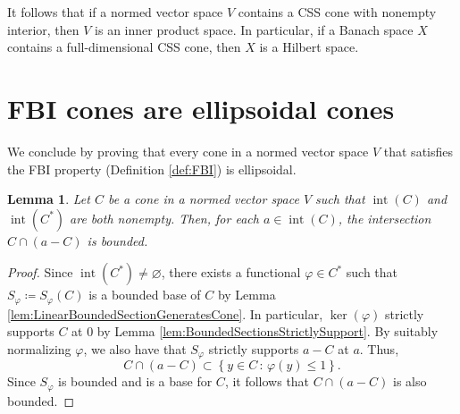 \documentclass[10pt]{amsart}
\newtheorem{lemma}[thm]{Lemma}
\theoremstyle{definition}
\theoremstyle{remark}
\begin{document}
It follows that if a normed vector space $V$ contains a CSS cone
with nonempty interior, then $V$ is an inner product space.  In
particular, if a Banach space $X$ contains a full-dimensional CSS
cone, then $X$ is a Hilbert space.

\section{FBI cones are ellipsoidal cones}
\label{sec:FBICones}

We conclude by proving that every cone in a normed vector space
$V$ that satisfies the FBI property (Definition \ref{def:FBI}) is
ellipsoidal.

\begin{lemma}
   \label{lem:ConeIntervalsAreBounded}
   Let $C$ be a cone in a normed vector space $V$ such that
   ${\operatorname{int}}(C)$ and ${\operatorname{int}}({C^{\ast}})$ are both nonempty.  Then, for
   each $a \in {\operatorname{int}}(C)$, the intersection $C \cap (a - C)$ is
   bounded.
\end{lemma}

\begin{proof}
   Since ${\operatorname{int}}({{C}^{\ast}}) \ne {\varnothing}$, there exists a
   functional ${\varphi} \in {C^{\ast}}$ such that $S_{\varphi} {\mathrel{\coloneqq}}
   S_{\varphi}(C)$ is a bounded base of $C$ by Lemma
   \ref{lem:LinearBoundedSectionGeneratesCone}.  In particular,
   $\ker({\varphi})$ strictly supports $C$ at $0$ by Lemma
   \ref{lem:BoundedSectionsStrictlySupport}.  By suitably
   normalizing ${\varphi}$, we also have that $S_{\varphi}$ strictly
   supports $a - C$ at $a$.  Thus,
   \begin{equation*}
      C \cap (a - C) \subset {\left\lbrace {y \in C {\,:\,} {\varphi}(y) \le 1} \right\rbrace}.
   \end{equation*}
   Since $S_{\varphi}$ is bounded and is a base for $C$, it follows
   that $C \cap (a - C)$ is also bounded.
\end{proof}
\end{document}
